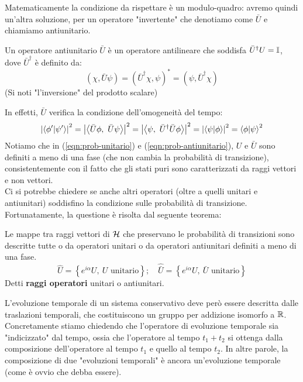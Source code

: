 \documentclass[../../FisicaTeorica.tex]{subfiles}
\begin{document}
Matematicamente la condizione da rispettare è un modulo-quadro: avremo quindi un'altra soluzione, per un operatore "invertente" che denotiamo come $\bar{U}$ e chiamiamo antiunitario.
\begin{dfn}
Un operatore antiunitario $\bar{U}$ è un operatore antilineare che soddisfa ${\bar{U}}^\dag U=\mathbb{I}$, dove ${\bar{U}}^\dag$ è definito da:
\[
\left(\chi,\bar{U}\psi\right)=\left({\bar{U}}^\dag\chi,\psi\right)^\ast=\left(\psi,{\bar{U}}^\dag\chi\right)
\]
(Si noti "l'inversione" del prodotto scalare)
\end{dfn}
In effetti, $\bar{U}$ verifica la condizione dell'omogeneità del tempo:
\begin{equation}
\left|\left\langle\phi^\prime\middle|\psi^\prime\right\rangle\right|^2=\left|\left\langle\bar{U}\phi,\ \bar{U}\psi\right\rangle\right|^2=\left|\left\langle\psi,\ {\bar{U}}^\dag\bar{U}\phi\right\rangle\right|^2=\left|\left\langle\psi\middle|\phi\right\rangle\right|^2=\braket{\phi|\psi}^2
\label{eqn:prob-antiunitario}
\end{equation}
Notiamo che in (\ref{eqn:prob-unitario}) e (\ref{eqn:prob-antiunitario}), $U$ e $\bar{U}$  sono definiti a meno di una fase (che non cambia la probabilità di transizione), consistentemente con il fatto che gli stati puri sono caratterizzati da raggi vettori e non vettori.\\
Ci si potrebbe chiedere se anche altri operatori (oltre a quelli unitari e antiunitari) soddisfino la condizione sulle probabilità di transizione.\\
Fortunatamente, la questione è risolta dal seguente teorema:
\begin{thm}
Le mappe tra raggi vettori di $\mathcal{H}$ che preservano le probabilità di transizioni sono descritte tutte o da operatori unitari o da operatori antiunitari definiti a meno di una fase.
\[
\hat{U}=\left\{e^{i\alpha}U,\ U\text{ unitario}\right\}; \quad 
\widehat{\bar{U}}=\left\{e^{i\alpha}U,\ \bar{U}\text{ unitario}\right\}
\]
Detti \textbf{raggi operatori} unitari o antiunitari.
\end{thm}
L'evoluzione temporale di un sistema conservativo deve però essere descritta dalle traslazioni temporali, che costituiscono un gruppo per addizione isomorfo a $\mathbb{R}$.\\
Concretamente stiamo chiedendo che l'operatore di evoluzione temporale sia "indicizzato" dal tempo, ossia che l'operatore al tempo $t_1+t_2$ si ottenga dalla composizione dell'operatore al tempo $t_1$ e quello al tempo $t_2$. In altre parole, la composizione di due "evoluzioni temporali" è ancora un'evoluzione temporale (come è ovvio che debba essere).\\
\end{document}

